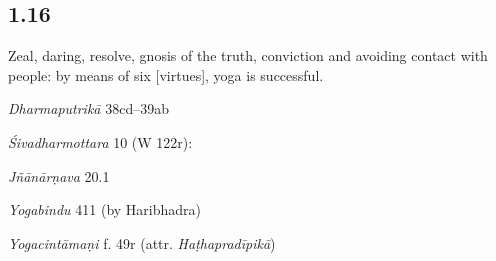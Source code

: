 \begin{ekdosis}
\subsection*{1.16}
\begin{translation}[hp01_016]
Zeal, daring, resolve, gnosis of the truth, conviction and avoiding contact with people: by means of six [virtues], yoga is successful.
\end{translation}

\begin{sources}[hp01_016]
\emph{Dharmaputrikā} 38cd–39ab

\begin{versinnote}
\end{versinnote}

\emph{Śivadharmottara} 10 (W 122r):%

\begin{versinnote}
\end{versinnote}

\emph{Jñānārṇava} 20.1

\begin{versinnote}
\end{versinnote}

\emph{Yogabindu} 411 (by Haribhadra)

\begin{versinnote}
\end{versinnote}

\end{sources}

\begin{testimonia}[hp01_016]
\emph{Yogacintāmaṇi} f. 49r (attr. \emph{Haṭhapradīpikā})


\end{testimonia}
\end{ekdosis}
